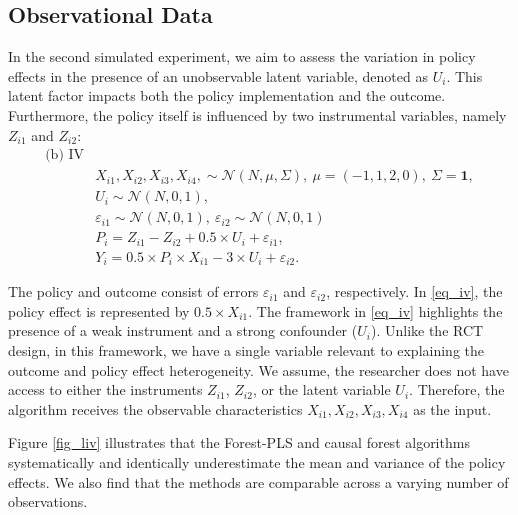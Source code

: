 \documentclass[12pt]{article}
\begin{document}
\subsection{Observational Data}
In the second simulated experiment, we aim to assess the variation in policy effects in the presence of an unobservable latent variable,  denoted as $U_i$. This latent factor impacts both the policy implementation and the outcome. Furthermore, the policy itself is influenced by two instrumental variables, namely $Z_{i1}$ and $Z_{i2}$: 
\begin{align} \label{eq_iv}
    \text{(b) IV} &\nonumber  \\
    &X_{i1}, X_{i2}, X_{i3}, X_{i4}, \sim \mathcal{N}(N, \mu, \Sigma), \ \mu = (-1, 1, 2, 0),  \ \Sigma = \mathbf{1},  \nonumber \\
    & U_i \sim \mathcal{N}(N, 0, 1),  \nonumber  \\
    & \varepsilon_{i1} \sim \mathcal{N}(N, 0, 1), \ \varepsilon_{i2} \sim \mathcal{N}(N, 0, 1)\nonumber  \\
    & P_i = Z_{i1}- Z_{i2} + 0.5\times U_i + \varepsilon_{i1}, \nonumber \\ 
    & Y_i =  0.5\times P_i\times X_{i1} - 3\times U_i + \varepsilon_{i2}.
\end{align}

The policy and outcome consist of errors $\varepsilon_{i1}$ and $\varepsilon_{i2}$, respectively. In \eqref{eq_iv}, the policy effect is represented by $0.5\times X_{i1}$. The framework in \eqref{eq_iv} highlights the presence of a weak instrument and a strong confounder ($U_i$). Unlike the RCT design, in this framework, we have a single variable relevant to explaining the outcome and policy effect heterogeneity. We assume, the researcher does not have access to either the instruments $Z_{i1}$, $Z_{i2}$, or the latent variable $U_i$. Therefore, the algorithm receives the observable characteristics  $X_{i1}, X_{i2}, X_{i3}, X_{i4}$ as the input. 

Figure \ref{fig_liv} illustrates that the Forest-PLS and causal forest algorithms systematically and identically underestimate the mean and variance of the policy effects. We also find that the methods are comparable across a varying number of observations. 
\end{document}
